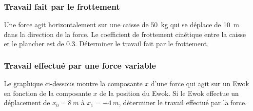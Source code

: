 \documentclass{beamer}
\begin{document}
\begin{frame}
  \frametitle{Travail fait par le frottement}

  Une force agit horizontalement sur une caisse de \SI{50}{kg} qui se déplace
  de \SI{10}{m} dans la direction de la force.  Le coefficient de frottement
  cinétique entre la caisse et le plancher est de \num{0.3}.  Déterminer le
  travail fait par le frottement.
  
\end{frame}


\begin{frame}
  \frametitle{Travail effectué par une force variable}

  Le graphique ci-dessous montre la composante $x$ d'une force qui agit sur un
  Ewok en fonction de
  la composante $x$ de la position du Ewok.  Si le Ewok effectue un déplacement
  de $x_0 = \SI{8}{m}$ à $x_1 = \SI{-4}{m}$, déterminer le travail effectué par la
  force.

  \begin{columns}


\end{columns}
\end{frame}
\end{document}
